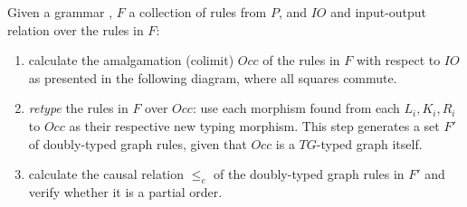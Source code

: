 \begin{definition}\label{def:ogg-construction} Given a grammar \graphGrammar{}, $F$ a collection of rules from $P$, and $IO$ and input-output relation over the rules in $F$:

\begin{enumerate}
  \item\label{enum:construction-colimit} calculate the amalgamation (colimit) $Occ$ of the rules in $F$ with respect to $IO$ as presented in the following diagram, where all squares commute.

\hfill\break


\item \emph{retype} the rules in $F$ over $Occ$: use each morphism found from each $L_i, K_i, R_i$ to $Occ$ as their respective new typing morphism. This step generates a set $F'$ of doubly-typed graph rules, given that $Occ$ is a $TG$-typed graph itself.

\item calculate the causal relation $\leq_{c}$ of the doubly-typed graph rules in $F'$ and verify whether it is a partial order.


\end{enumerate}
\end{definition}
